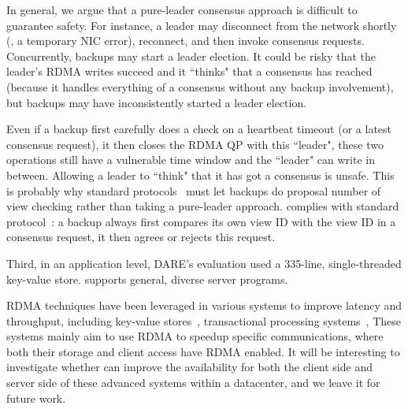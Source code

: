 In general, we argue that a pure-leader consensus approach is difficult to 
guarantee safety. For instance, a leader may disconnect from the network 
shortly (\eg, a temporary NIC error), reconnect, and then invoke 
consensus requests. Concurrently, backups may start a leader election. It could 
be risky that the leader's RDMA writes succeed and it ``thinks" that a 
consensus has reached (because it handles everything of a consensus without any 
backup involvement), but backups may have inconsistently started a leader 
election.

Even if a backup first carefully does a check on a heartbeat timeout (or a 
latest consensus request), it then closes the RDMA QP with this ``leader", 
these two operations still have a vulnerable time window and the ``leader" can 
write in between. Allowing a leader to ``think" that it has got a consensus 
is unsafe. This is probably why standard \paxos 
protocols~\cite{paxos,paxos:simple,paxos:practical} must let backups do proposal 
number of view checking rather than taking a pure-leader approach. \xxx complies 
with standard \paxos protocol~\cite{paxos:practical}: a \xxx backup always 
first compares its own view ID with the view ID in a consensus request, it then 
agrees or rejects this request.

Third, in an application level, DARE's evaluation used a 335-line, 
single-threaded key-value store. \xxx supports general, diverse server 
programs.





 RDMA techniques have been leveraged in various systems 
to improve latency and throughput, including key-value 
stores~\cite{pilaf:usenix14,herd:sigcomm14,farm:nsdi14}, transactional 
processing systems~\cite{drtm:sosp15,farm:sosp15},  These systems mainly aim to 
use RDMA to speedup specific communications, where both their storage and client 
access have RDMA enabled. It will be interesting to investigate whether \xxx can 
improve the availability for both the client side and server side of these 
advanced systems within a datacenter, and we leave it for future work.

